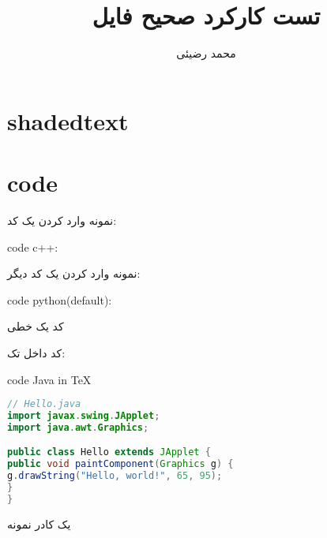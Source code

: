 \documentclass[12pt]{article}
\title{تست کارکرد صحیح فایل}
\author{محمد رضیئی}
\begin{document}
\maketitle

\section{shadedtext}
\ptext[1]
\begin{shadedtext}
	\ptext[1-10]
\end{shadedtext}
\ptext[1]

\section{code}
	نمونه وارد کردن یک کد:
\begin{latin}
\noindent code c++:

\end{latin}	

نمونه وارد کردن یک کد دیگر:
\begin{latin}
\noindent code python(default):

\end{latin}
کد یک خطی

کد داخل تک:
\begin{latin}
\noindent code Java in \TeX
\begin{lstlisting}[language = Java]
// Hello.java
import javax.swing.JApplet;
import java.awt.Graphics;

public class Hello extends JApplet {
public void paintComponent(Graphics g) {
g.drawString("Hello, world!", 65, 95);
}    
}
\end{lstlisting}
\end{latin}

\hlineshort



یک کادر نمونه


\hlinelong
\end{document}
